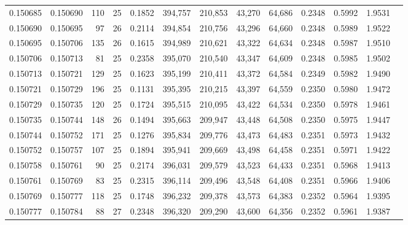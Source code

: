 \begin{tabular}{rrrrrrrrrrrrr}
0.150685 & 0.150690 & 110 &  25 &                                     0.1852 & 394,757 & 210,853 &  43,270 &  64,686 & 0.2348 & 0.5992 & 1.9531 \\
0.150690 & 0.150695 &  97 &  26 &                                     0.2114 & 394,854 & 210,756 &  43,296 &  64,660 & 0.2348 & 0.5989 & 1.9522 \\
0.150695 & 0.150706 & 135 &  26 &                                     0.1615 & 394,989 & 210,621 &  43,322 &  64,634 & 0.2348 & 0.5987 & 1.9510 \\
0.150706 & 0.150713 &  81 &  25 &                                     0.2358 & 395,070 & 210,540 &  43,347 &  64,609 & 0.2348 & 0.5985 & 1.9502 \\
0.150713 & 0.150721 & 129 &  25 &                                     0.1623 & 395,199 & 210,411 &  43,372 &  64,584 & 0.2349 & 0.5982 & 1.9490 \\
0.150721 & 0.150729 & 196 &  25 &                                     0.1131 & 395,395 & 210,215 &  43,397 &  64,559 & 0.2350 & 0.5980 & 1.9472 \\
0.150729 & 0.150735 & 120 &  25 &                                     0.1724 & 395,515 & 210,095 &  43,422 &  64,534 & 0.2350 & 0.5978 & 1.9461 \\
0.150735 & 0.150744 & 148 &  26 &                                     0.1494 & 395,663 & 209,947 &  43,448 &  64,508 & 0.2350 & 0.5975 & 1.9447 \\
0.150744 & 0.150752 & 171 &  25 &                                     0.1276 & 395,834 & 209,776 &  43,473 &  64,483 & 0.2351 & 0.5973 & 1.9432 \\
0.150752 & 0.150757 & 107 &  25 &                                     0.1894 & 395,941 & 209,669 &  43,498 &  64,458 & 0.2351 & 0.5971 & 1.9422 \\
0.150758 & 0.150761 &  90 &  25 &                                     0.2174 & 396,031 & 209,579 &  43,523 &  64,433 & 0.2351 & 0.5968 & 1.9413 \\
0.150761 & 0.150769 &  83 &  25 &                                     0.2315 & 396,114 & 209,496 &  43,548 &  64,408 & 0.2351 & 0.5966 & 1.9406 \\
0.150769 & 0.150777 & 118 &  25 &                                     0.1748 & 396,232 & 209,378 &  43,573 &  64,383 & 0.2352 & 0.5964 & 1.9395 \\
0.150777 & 0.150784 &  88 &  27 &                                     0.2348 & 396,320 & 209,290 &  43,600 &  64,356 & 0.2352 & 0.5961 & 1.9387 \\

\end{tabular}
